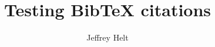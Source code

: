 \documentclass[10pt,twocolumn]{article}
\title{\sffamily\fontsize{18}{18}
\textbf{Testing BibTeX citations}}
\author{\large Jeffrey Helt}
\begin{document}
\maketitle

\begin{sloppypar}



\begin{small}


\end{small}


\end{sloppypar}
\end{document}
